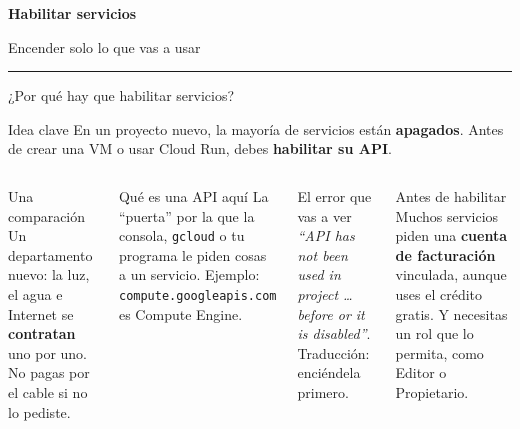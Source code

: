 \documentclass[aspectratio=169,10pt,c]{beamer}
\begin{document}
\begin{frame}[plain]
\vfill
\begin{center}
{\fontsize{29}{34}\selectfont\bfseries Habilitar servicios}\par
\vspace{2mm}
{\small Encender solo lo que vas a usar}\par
\vspace{4mm}
{\color{utpRojo}\rule{8.5cm}{1.2pt}}
\end{center}
\vfill
\end{frame}

\begin{frame}{¿Por qué hay que habilitar servicios?}
\begin{block}{Idea clave}
\small En un proyecto nuevo, la mayoría de servicios están \textbf{apagados}. Antes de crear una VM o usar Cloud Run, debes \textbf{habilitar su API}.
\end{block}
\begin{columns}[T,onlytextwidth]
\begin{exampleblock}{Una comparación}
\small Un departamento nuevo: la luz, el agua e Internet se \textbf{contratan} uno por uno. No pagas por el cable si no lo pediste.
\end{exampleblock}
\begin{block}{Qué es una API aquí}
\small La ``puerta'' por la que la consola, \texttt{gcloud} o tu programa le piden cosas a un servicio. Ejemplo: \texttt{compute.googleapis.com} es Compute Engine.
\end{block}
\begin{alertblock}{El error que vas a ver}
\small \emph{``API has not been used in project \ldots{} before or it is disabled''}. Traducción: enciéndela primero.
\end{alertblock}
\begin{block}{Antes de habilitar}
\small Muchos servicios piden una \textbf{cuenta de facturación} vinculada, aunque uses el crédito gratis. Y necesitas un rol que lo permita, como Editor o Propietario.
\end{block}
\end{columns}
\end{frame}
\end{document}
